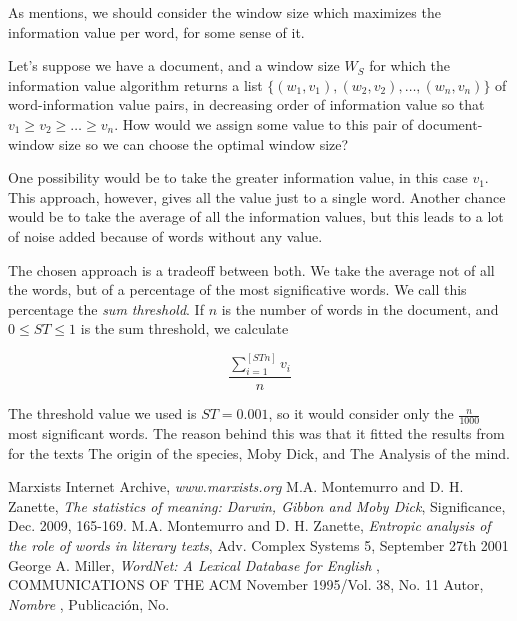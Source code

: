 \documentclass{pnastwo}
\begin{document}
\begin{article}

As \cite{DARWIN} mentions, we should consider the window size which maximizes the information value per word, for some sense of it.

Let's suppose we have a document, and a window size $W_S$ for which the information value algorithm returns a list $\{(w_1, v_1), (w_2, v_2), \dots ,(w_n, v_n) \}$ of word-information value pairs, in decreasing order of information value so that $v_1 \geq v_2 \geq \dots \geq v_n$. How would we assign some value to this pair of document-window size so we can choose the optimal window size?

One possibility would be to take the greater information value, in this case $v_1$. This approach, however, gives all the value just to a single word. Another chance would be to take the average of all the information values, but this leads to a lot of noise added because of words without any value.


The chosen approach is a tradeoff between both. We take the average not of all the words, but of a percentage of the most significative words. We call this percentage the \emph{sum threshold}. If $n$ is the number of words in the document, and $0 \leq ST \leq 1$ is the sum threshold, we calculate

\begin{equation}
  \frac{\sum_{i=1}^{[ST n]}v_i}{n} 
\end{equation}


The threshold value we used is $ST=0.001$, so it would consider only the $\frac{n}{1000}$ most significant words. The reason behind this was that it fitted the results from \cite{DARWIN} for the texts The origin of the species, Moby Dick, and  The Analysis of the mind.


\begin{thebibliography}{10}
Marxists Internet Archive, {\em www.marxists.org} %
M.A. Montemurro and D. H. Zanette, {\em The statistics of meaning: Darwin, Gibbon and Moby Dick}, Significance, Dec. 2009, 165-169.
M.A. Montemurro and D. H. Zanette, {\em Entropic analysis of the role of words in literary texts}, Adv. Complex Systems 5, September 27th 2001
George A. Miller, {\em WordNet: A Lexical Database for English }, COMMUNICATIONS OF THE ACM November 1995/Vol. 38, No. 11
Autor, {\em Nombre }, Publicación, No. %
\end{thebibliography}
\end{article}
\end{document}
